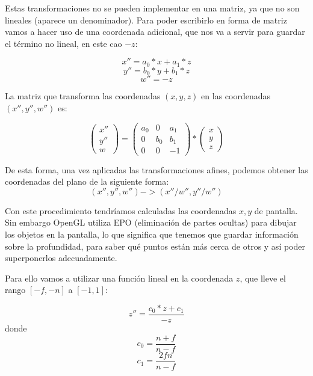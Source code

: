 \documentclass[a4paper,11pt, oneside]{book}
\begin{document}
Estas transformaciones no se pueden implementar en una matriz, ya que no son lineales (aparece un denominador). Para poder escribirlo en forma de matriz vamos a hacer uso de una coordenada adicional, que nos va a servir para guardar el término no lineal, en este cao $-z$:

\begin{equation}
x'' = a_0*x+a_1*z
\end{equation}
\begin{equation}
y'' = b_0*y+b_1*z
\end{equation}
\begin{equation}
w'' = -z
\end{equation}

La matriz que transforma las coordenadas $(x,y,z)$ en las coordenadas $(x'',y'',w'')$ es:

$$\begin{pmatrix}
x''\\
y''\\
w
\end{pmatrix}=
\begin{pmatrix}
	a_0 & 0&a_1\\
	0&b_0&b_1\\
	0&0&-1
\end{pmatrix}*
\begin{pmatrix}
x\\
y\\
z
\end{pmatrix}
$$


De esta forma, una vez aplicadas las transformaciones afines, podemos obtener las coordenadas del plano de la siguiente forma:
\begin{equation}
(x'',y'',w'') -> (x''/w'', y''/w'')
\end{equation}


Con este procedimiento tendríamos calculadas las coordenadas $x,y$ de pantalla. Sin embargo OpenGL utiliza EPO (eliminación de partes ocultas) para dibujar los objetos en la pantalla, lo que significa que tenemos que guardar información sobre la profundidad, para saber qué puntos están más cerca de otros y así poder superponerlos adecuadamente. 

Para ello vamos a  utilizar una función lineal en la coordenada $z$, que lleve el rango $[-f,-n]$ a $[-1,1]$:

\begin{equation}
z'' = \frac{c_0*z+c_1}{-z}
\end{equation}
donde
\begin{equation}
c_0 = \frac{n+f}{n-f}
\end{equation}
\begin{equation}
c_1 = \frac{2fn}{n-f}
\end{equation}
\end{document}
